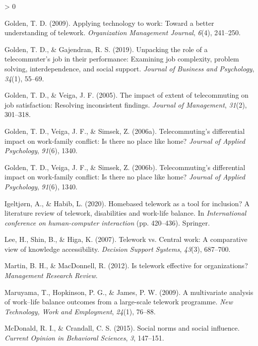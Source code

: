 \documentclass[
  english,
  man]{apa6}
\newlength{\cslhangindent}
\newenvironment{CSLReferences}[2] %
 {%
  \setlength{\parindent}{0pt}
  \ifodd #1 \everypar{\setlength{\hangindent}{\cslhangindent}}\ignorespaces\fi
  \ifnum #2 > 0
  \setlength{\parskip}{#2\baselineskip}
  \fi
 }%
 {}
\begin{document}
\begin{CSLReferences}{1}{0}
\leavevmode\hypertarget{ref-golden_applying_2009}{}%
Golden, T. D. (2009). Applying technology to work: Toward a better understanding of telework. \emph{Organization Management Journal}, \emph{6}(4), 241--250.

\leavevmode\hypertarget{ref-golden_unpacking_2019}{}%
Golden, T. D., \& Gajendran, R. S. (2019). Unpacking the role of a telecommuter's job in their performance: Examining job complexity, problem solving, interdependence, and social support. \emph{Journal of Business and Psychology}, \emph{34}(1), 55--69.

\leavevmode\hypertarget{ref-golden_impact_2005}{}%
Golden, T. D., \& Veiga, J. F. (2005). The impact of extent of telecommuting on job satisfaction: Resolving inconsistent findings. \emph{Journal of Management}, \emph{31}(2), 301--318.

\leavevmode\hypertarget{ref-golden_telecommutings_2006}{}%
Golden, T. D., Veiga, J. F., \& Simsek, Z. (2006a). Telecommuting's differential impact on work-family conflict: Is there no place like home? \emph{Journal of Applied Psychology}, \emph{91}(6), 1340.

\leavevmode\hypertarget{ref-golden_telecommutings_2006-1}{}%
Golden, T. D., Veiga, J. F., \& Simsek, Z. (2006b). Telecommuting's differential impact on work-family conflict: Is there no place like home? \emph{Journal of Applied Psychology}, \emph{91}(6), 1340.

\leavevmode\hypertarget{ref-igeltjorn_homebased_2020}{}%
Igeltjørn, A., \& Habib, L. (2020). Homebased telework as a tool for inclusion? A literature review of telework, disabilities and work-life balance. In \emph{International conference on human-computer interaction} (pp. 420--436). Springer.

\leavevmode\hypertarget{ref-lee_telework_2007}{}%
Lee, H., Shin, B., \& Higa, K. (2007). Telework vs. Central work: A comparative view of knowledge accessibility. \emph{Decision Support Systems}, \emph{43}(3), 687--700.

\leavevmode\hypertarget{ref-martin_is_2012}{}%
Martin, B. H., \& MacDonnell, R. (2012). Is telework effective for organizations? \emph{Management Research Review}.

\leavevmode\hypertarget{ref-maruyama_multivariate_2009}{}%
Maruyama, T., Hopkinson, P. G., \& James, P. W. (2009). A multivariate analysis of work--life balance outcomes from a large-scale telework programme. \emph{New Technology, Work and Employment}, \emph{24}(1), 76--88.

\leavevmode\hypertarget{ref-mcdonald_social_2015}{}%
McDonald, R. I., \& Crandall, C. S. (2015). Social norms and social influence. \emph{Current Opinion in Behavioral Sciences}, \emph{3}, 147--151.


\end{CSLReferences}
\end{document}
